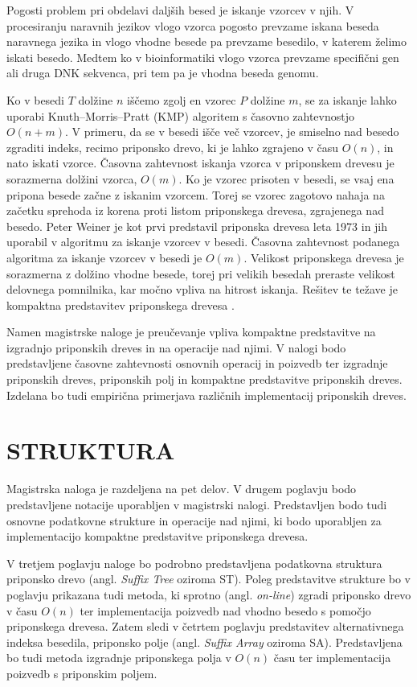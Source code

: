 Pogosti problem pri obdelavi daljših besed je iskanje vzorcev v njih. V procesiranju naravnih jezikov vlogo vzorca pogosto prevzame iskana beseda naravnega jezika in vlogo vhodne besede pa prevzame besedilo, v katerem želimo iskati besedo. Medtem ko v bioinformatiki vlogo vzorca prevzame specifični gen ali druga DNK sekvenca, pri tem pa je vhodna beseda genomu. 

Ko v besedi $T$ dolžine $n$ iščemo zgolj en vzorec $P$ dolžine $m$, se za iskanje lahko uporabi Knuth–Morris–Pratt (KMP) algoritem s časovno zahtevnostjo $O(n+m)$. V primeru, da se v besedi išče več vzorcev, je smiselno nad besedo zgraditi indeks, recimo priponsko drevo, ki je lahko zgrajeno v času $O(n)$, in nato iskati vzorce. Časovna zahtevnost iskanja vzorca v priponskem drevesu je sorazmerna dolžini vzorca, $O(m)$. Ko je vzorec prisoten v besedi, se vsaj ena pripona besede začne z iskanim vzorcem. 
Torej se vzorec zagotovo nahaja na začetku sprehoda iz korena proti listom priponskega drevesa, zgrajenega nad besedo. 
Peter Weiner je kot prvi predstavil priponska drevesa leta 1973 \cite{Weiner1973} in jih uporabil v algoritmu za iskanje vzorcev v besedi. Časovna zahtevnost podanega algoritma za iskanje vzorcev v besedi je $O(m)$. Velikost priponskega drevesa je sorazmerna z dolžino vhodne besede, torej pri velikih besedah preraste velikost delovnega pomnilnika, kar močno vpliva na hitrost iskanja. Rešitev te težave je kompaktna predstavitev priponskega drevesa \cite{Navarro2016}.

Namen magistrske naloge je preučevanje vpliva kompaktne predstavitve na izgradnjo priponskih dreves in na operacije nad njimi. V nalogi bodo predstavljene časovne zahtevnosti osnovnih operacij in poizvedb ter izgradnje priponskih dreves, priponskih polj in kompaktne predstavitve priponskih dreves. Izdelana bo tudi empirična primerjava različnih implementacij priponskih dreves.

\section{STRUKTURA}\label{sec:struktura}

Magistrska naloga je razdeljena na pet delov. V drugem poglavju bodo predstavljene notacije uporabljen v magistrski nalogi. Predstavljen bodo tudi osnovne podatkovne strukture in operacije nad njimi, ki bodo uporabljen za implementacijo kompaktne predstavitve priponskega drevesa.

V tretjem poglavju naloge bo podrobno predstavljena podatkovna struktura priponsko drevo (angl. \textit{Suffix Tree} oziroma ST). Poleg predstavitve strukture bo v poglavju prikazana tudi metoda, ki sprotno (angl. \textit{on-line}) zgradi priponsko drevo v času $O(n)$ ter implementacija poizvedb nad vhodno besedo s pomočjo priponskega drevesa. Zatem sledi v četrtem poglavju predstavitev alternativnega indeksa besedila, priponsko polje (angl. \textit{Suffix Array} oziroma SA). Predstavljena bo tudi metoda izgradnje priponskega polja v $O(n)$ času ter implementacija poizvedb s priponskim poljem.

